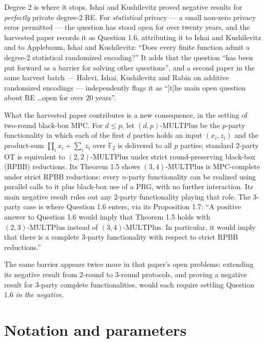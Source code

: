 \documentclass{aicr-conjecture}
\newcommand{\MULT}{\mathrm{MULTPlus}}
\begin{document}
Degree 2 is where it stops. Ishai and Kushilevitz proved negative results
for \emph{perfectly} private degree-2 RE\@. For \emph{statistical} privacy
--- a small non-zero privacy error permitted --- the question has stood
open for over twenty years, and the harvested paper records it as
Question 1.6, attributing it to Ishai and Kushilevitz and to Applebaum,
Ishai and Kushilevitz: ``Does every finite function admit a degree-2
statistical randomized encoding?'' It adds that the question ``has been
put forward as a barrier for solving other questions'', and a second paper
in the same harvest batch --- Halevi, Ishai, Kushilevitz and Rabin on
additive randomized encodings --- independently flags it as ``[t]he main
open question about RE \dots open for over 20 years''.

What the harvested paper contributes is a new consequence, in the setting
of two-round black-box MPC\@. For $d \le p$, let $(d,p)\text{-}\MULT$ be the
$p$-party functionality in which each of the first $d$ parties holds an
input $(x_{i}, z_{i})$ and the product-sum $\prod_{i} x_{i} + \sum_{i}
z_{i}$ over $\mathbb{F}_{2}$ is delivered to all $p$ parties; standard
2-party OT is equivalent to $(2,2)\text{-}\MULT$ under strict
round-preserving black-box (RPBB) reductions. Its Theorem 1.5 shows
$(3,4)\text{-}\MULT$ is MPC-complete under strict RPBB reductions: every
$n$-party functionality can be realized using parallel calls to it plus
black-box use of a PRG, with no further interaction. Its main negative
result rules out any 2-party functionality playing that role. The 3-party
case is where Question 1.6 enters, via its Proposition 1.7: ``A positive
answer to Question 1.6 would imply that Theorem 1.5 holds with
$(2,3)\text{-}\MULT$ instead of $(3,4)\text{-}\MULT$. In particular, it
would imply that there is a complete 3-party functionality with respect
to strict RPBB reductions.''

The same barrier appears twice more in that paper's open problems:
extending its negative result from 2-round to 3-round protocols, and
proving a negative result for 3-party complete functionalities, would each
require settling Question 1.6 \emph{in the negative}.

\section{Notation and parameters}\label{sec:notation}
\end{document}
